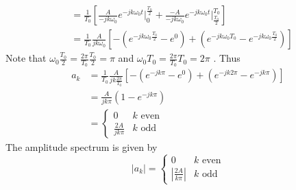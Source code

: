 \begin{example}
\begin{align*}
    &= \frac{1}{T_0} \left[ \frac{A}{-jk\omega_0}e^{-jk\omega_0 t} \Big|_{0}^{\frac{T_0}{2}} + \frac{-A}{-jk\omega_0}e^{-jk\omega_0 t} \Big|_{\frac{T_0}{2}}^{T_0}\right]\\
    &= \frac{1}{T_0} \frac{A}{jk\omega_0} \left[ -\left(e^{-jk\omega_0 \frac{T_0}{2}} - e^{0}\right) + \left(e^{-jk\omega_0 T_0} - e^{-jk\omega_0 \frac{T_0}{2}}\right)\right]
  \end{align*}
  Note that $\omega_0\frac{T_0}{2} = \frac{2\pi}{T_0}\frac{T_0}{2}= \pi$ and $\omega_0 T_0 = \frac{2\pi}{T_0}T_0 = 2\pi$ . Thus
  \begin{align*}
    a_k &= \frac{1}{T_0} \frac{A}{jk\frac{2\pi}{T_0}} \left[ -\left(e^{-jk\pi} - e^{0}\right) + \left(e^{-jk2\pi} - e^{-jk\pi}\right)\right]\\
    &= \frac{A}{jk\pi}\left( 1-e^{-jk\pi}\right) \\
    &= \left\{ \begin{array}{lc}
      0 & k \mbox{ even}\\
      \frac{2A}{jk\pi} & k \mbox{ odd}
    \end{array}
\right.
  \end{align*}
  The amplitude spectrum is given by
  \[
  |a_k| = \left\{ \begin{array}{lc}
    0 & k \mbox{ even}\\
    \left|\frac{2A}{k\pi}\right| & k \mbox{ odd}\end{array}\right.
  \]


\end{example}

